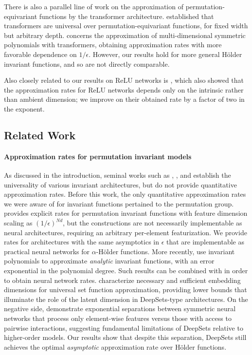 \documentclass[twoside,11pt]{article}
\newcommand{\ah}{$\alpha$-H\"older }
\begin{document}
There is also a parallel line of work on the approximation of permutation-equivariant functions by the transformer architecture. \citet{yun2020are} established that transformers are universal over permutation-equivariant functions, for fixed width but arbitrary depth. \citet{TakeshitaImaizumi2025} concerns the approximation of multi-dimensional symmetric polynomials with transformers, obtaining  approximation rates with more favorable dependence on $1/\epsilon$. However, our results hold for more general H\"older invariant functions, and so are not directly comparable.

Also closely related to our results on ReLU networks is \citet{nakada2020adaptive}, which also showed that the approximation rates for ReLU networks depends only on the intrinsic rather than ambient dimension; we  improve on their obtained rate by a factor of two in the exponent.
\fi

\subsection{Related Work}
\paragraph{Approximation rates for permutation invariant models}
As discussed in the introduction, seminal works such as \citet{maron2019universality}, \citet{zaheer2017deep}, and \citet{Yarotsky2022InvariantMaps} establish the universality of various invariant architectures, but do not provide quantitative approximation rates. Before this work, the only quantitative approximation rates we were aware of for invariant functions pertained to the permutation group. \citet{han2022universal} provides explicit rates for permutation invariant functions with feature dimension scaling as $(1/ \epsilon)^{Nd}$, but the constructions are not necessarily implementable as neural architectures, requiring an arbitrary per-element featurization. We provide rates for architectures with the same asymptotics in $\epsilon$ that are implementable as practical neural networks for \ah functions. More recently, \citet{bachmayr2024polynomial} use invariant polynomials to approximate \emph{analytic} invariant functions, with an error exponential in the polynomial degree. Such results can be combined with \citet{siegel2023optimal} in order to obtain neural network rates. \citet{wagstaff2022universal} characterize necessary and sufficient embedding dimensions for universal set function approximation, providing lower bounds that illuminate the role of the latent dimension in DeepSets-type architectures. On the negative side, \citet{zweig2022exponential} demonstrate exponential separations between symmetric neural networks that process only element-wise features versus those with access to pairwise interactions, suggesting fundamental limitations of DeepSets relative to higher-order models. Our results show that despite this separation, DeepSets still achieves the optimal \emph{asymptotic} approximation rate over H\"older functions.
\end{document}

